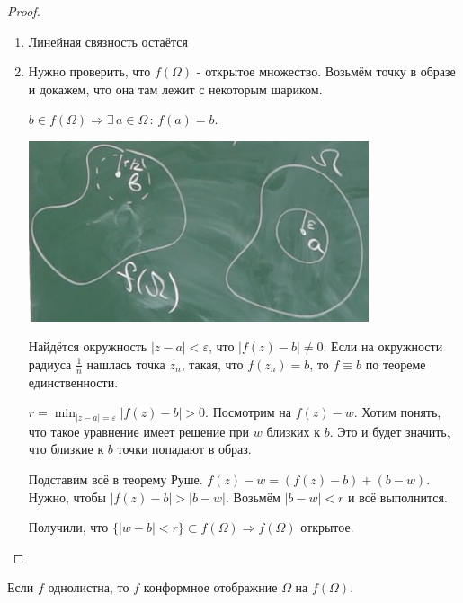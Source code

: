 \begin{proof}
    \begin{enumerate}
        \item {
            Линейная связность остаётся
        }
        \item {
            Нужно проверить, что $f(\Omega)$ - открытое множество. Возьмём точку 
            в образе и докажем, что она там лежит с некоторым шариком.

            $b \in f(\Omega) \Rightarrow \exists \, a \in \Omega \, : \, f(a) = b$.


            \begin{center}
                \includegraphics[width=10cm]{assets/04-functions-of-complex-variables/single-leaf-theorem.png}
            \end{center}

            Найдётся окружность $|z - a| < \varepsilon$, что $|f(z) - b| \neq 0$. Если на окружности радиуса $\frac{1}{n}$ нашлась точка $z_n$, 
            такая, что $f(z_n) = b$, то $f \equiv b$ по теореме единственности.

            $r = \min_{|z - a| = \varepsilon} |f(z) - b| > 0$. Посмотрим на $f(z) - w$. Хотим понять, что такое уравнение
            имеет решение при $w$ близких к $b$. Это и будет значить, что близкие к $b$ точки попадают в образ.

            Подставим всё в теорему Руше. $f(z) - w = (f(z) - b) + (b - w)$. Нужно, чтобы $|f(z) - b| > |b - w|$. Возьмём $|b-w| < r$ и всё выполнится.

            Получили, что $\{ |w-b| < r \} \subset f(\Omega) \Rightarrow f(\Omega)$ открытое.
        }
    \end{enumerate}
\end{proof}

\begin{consequence}
    Если $f$ однолистна, то $f$ конформное отображние $\Omega$ на $f(\Omega)$.
\end{consequence}

